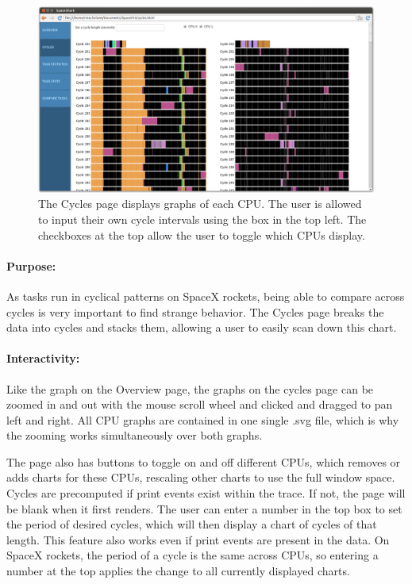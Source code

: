 \documentclass{hmcclinic}
\begin{document}
  \begin{figure}[H]
  \centering
      \includegraphics[width=5in]{cycles-page.png}
  \caption{The Cycles page displays graphs of each CPU. The user is allowed to
  input their own cycle intervals using the box in the top left. The checkboxes
at the top allow the user to toggle which CPUs display.}
  \end{figure}
  
  \paragraph{Purpose:}As tasks run in cyclical patterns on SpaceX rockets, being able to compare
  across cycles is very important to find strange behavior. The Cycles page
  breaks the data into cycles and stacks them, allowing a user to easily scan
  down this chart.

\paragraph{Interactivity:}    
    Like the graph on the Overview page, the graphs on the cycles page can be zoomed in and out with the mouse scroll wheel and clicked and dragged to pan left and right. All CPU graphs are contained in one single .svg file, which is why the zooming works simultaneously over both graphs.

The page also has buttons to toggle on and off different CPUs, which removes
    or adds charts for these CPUs, rescaling other charts to use the full window
    space. Cycles are precomputed if print events exist within the trace. If
    not, the page will be blank when it first renders. The user can enter a
    number in the top box to set the period of desired cycles, which will then
    display a chart of cycles of that length. This feature also works even if
    print events are present in the data. On SpaceX rockets, the period of a cycle 
    is the same across CPUs, so entering a number at the top applies the change
    to all currently displayed charts.
        
\end{document}
